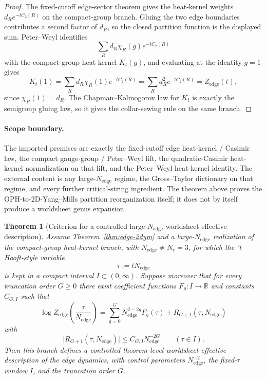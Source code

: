 \documentclass[11pt]{article}
\newtheorem{theorem}{Theorem}[section]
\begin{document}
\begin{proof}
The fixed-cutoff edge-sector theorem gives the heat-kernel weights \(d_R e^{-tC_2(R)}\) on the
compact-group branch. Gluing the two edge boundaries contributes a second factor of \(d_R\), so the
closed partition function is the displayed sum. Peter--Weyl identifies
\[
\sum_R d_R \chi_R(g)e^{-tC_2(R)}
\]
with the compact-group heat kernel \(K_t(g)\), and evaluating at the identity \(g=1\) gives
\[
K_t(1)=\sum_R d_R \chi_R(1)e^{-tC_2(R)}=\sum_R d_R^2 e^{-tC_2(R)}=Z_{\mathrm{edge}}(t),
\]
since \(\chi_R(1)=d_R\). The Chapman--Kolmogorov law for \(K_t\) is exactly the semigroup gluing
law, so it gives the collar-sewing rule on the same branch.
\end{proof}

\paragraph{Scope boundary.}
The imported premises are exactly the fixed-cutoff edge heat-kernel / Casimir law, the compact
gauge-group / Peter--Weyl lift, the quadratic-Casimir heat-kernel normalization on that lift, and
the Peter--Weyl heat-kernel identity. The external content is any large-\(N_{\mathrm{edge}}\)
regime, the Gross--Taylor dictionary on that regime, and every further critical-string
ingredient. The theorem above proves the OPH-to-2D-Yang--Mills partition reorganization itself; it
does not by itself produce a worldsheet genus expansion.

\begin{theorem}[Criterion for a controlled large-$N_{\mathrm{edge}}$ worldsheet effective description]\label{thm:worldsheet-largeN}
Assume Theorem~\ref{thm:edge-2dym} and a large-$N_{\mathrm{edge}}$
realization of the compact-group heat-kernel branch, with \(N_{\mathrm{edge}}\neq N_c=3\), for
which the 't Hooft-style variable
\[
\tau:=tN_{\mathrm{edge}}
\]
is kept in a compact interval \(I\subset (0,\infty)\). Suppose moreover that for every truncation
order \(G\ge 0\) there exist coefficient functions \(F_g:I\to\mathbb R\) and constants
\(C_{G,I}\) such that
\[
\log Z_{\mathrm{edge}}\!\left(\frac{\tau}{N_{\mathrm{edge}}}\right)
=
\sum_{g=0}^{G} N_{\mathrm{edge}}^{2-2g} F_g(\tau)
+
R_{G+1}(\tau,N_{\mathrm{edge}})
\]
with
\[
\bigl|R_{G+1}(\tau,N_{\mathrm{edge}})\bigr|
\le
C_{G,I}N_{\mathrm{edge}}^{-2G}
\qquad(\tau\in I).
\]
Then this branch defines a controlled theorem-level worldsheet effective description of the edge
dynamics, with control parameters \(N_{\mathrm{edge}}^{-2}\), the fixed-\(\tau\) window \(I\),
and the truncation order \(G\).
\end{theorem}
\end{document}
